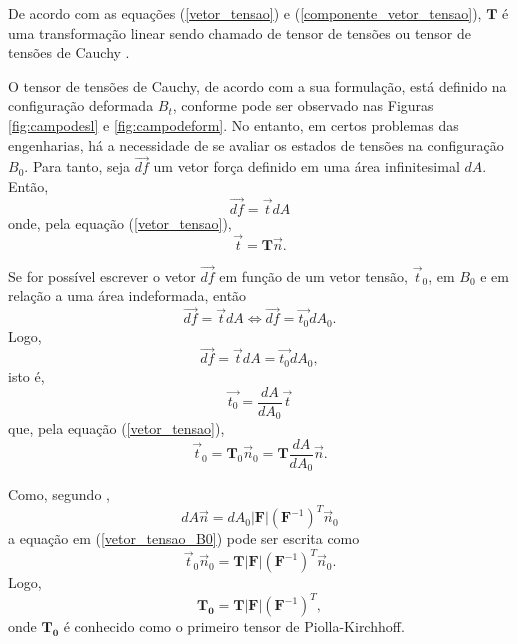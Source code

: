 De acordo com as equações (\ref{vetor_tensao}) e (\ref{componente_vetor_tensao}), $ \textbf{T} $ é uma transformação linear sendo chamado de tensor de tensões ou tensor de tensões de Cauchy \cite{Lai}.

O tensor de tensões de Cauchy, de acordo com a sua formulação, está definido na configuração deformada $ B_{t} $, conforme pode ser observado nas Figuras \ref{fig:campodesl} e \ref{fig:campodeform}. No entanto, em certos problemas das engenharias, há a necessidade de se avaliar os estados de tensões na configuração $ B_{0} $. Para tanto, seja $ \vec{df} $ um vetor força definido em uma área infinitesimal $ dA $. Então, 
\begin{equation}
	\vec{df}  = \vec{t} dA
\end{equation}
onde, pela equação (\ref{vetor_tensao}), 
\begin{equation}
	\vec{t} = \textbf{T} \vec{n}.
\end{equation}

Se for possível escrever o vetor $ \vec{df} $ em função de um vetor tensão, $ \vec{t} _{0} $, em $ B_{0} $ e em relação a uma área indeformada, então
\begin{equation}
	\vec{df}  = \vec{t} dA \Longleftrightarrow \vec{df}  = \vec{t_{0}} dA_{0}.
\end{equation}
Logo,
\begin{equation}
	\vec{df}  = \vec{t} dA  = \vec{t_{0}} dA_{0},
\end{equation}
isto é,
\begin{equation}
	\vec{t_{0}} = \dfrac{dA}{dA_{0}} \vec{t}
\end{equation}
que, pela equação (\ref{vetor_tensao}),
\begin{equation} \label{vetor_tensao_B0}
	\vec{t}_{0} = \textbf{T}_{0} \vec{n}_{0} = \textbf{T} \dfrac{dA}{dA_{0}} \vec{n}. 
\end{equation}

Como, segundo , 
\begin{equation}
	dA \vec{n} = dA_{0} \vert \textbf{F} \vert ( \textbf{F} ^{-1}) ^{T} \vec{n} _{0}
\end{equation}
a equação em (\ref{vetor_tensao_B0}) pode ser escrita como
\begin{equation}
	\vec{t}_{0}  \vec{n} _{0} = \textbf{T}  \vert \textbf{F} \vert ( \textbf{F} ^{-1}) ^{T} \vec{n} _{0}.
\end{equation}
Logo,
\begin{equation} \label{tensor_PK}
	\textbf{T} _{ \textbf{0}} = \textbf{T}  \vert \textbf{F} \vert ( \textbf{F} ^{-1}) ^{T},
\end{equation}
onde $ \textbf{T} _{ \textbf{0}} $ é conhecido como o primeiro tensor de Piolla-Kirchhoff.

